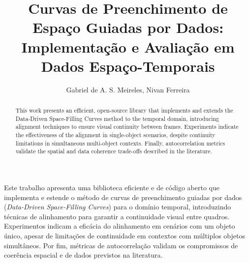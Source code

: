\documentclass[12pt]{article}
\title{Curvas de Preenchimento de Espaço Guiadas por Dados: \\ Implementação e Avaliação
em Dados Espaço-Temporais}
\author{Gabriel de A. S. Meireles, Nivan Ferreira}
\begin{document}
 

\maketitle

\begin{abstract}
  This work presents an efficient, open-source library that implements and extends the Data-Driven
  Space-Filling Curves method to the temporal domain, introducing alignment techniques to ensure visual continuity between
  frames. Experiments indicate the effectiveness of the alignment in single-object scenarios, despite continuity limitations
  in simultaneous multi-object contexts. Finally, autocorrelation metrics validate the spatial and data coherence trade-offs
  described in the literature.
\end{abstract}
     
\begin{resumo} 
  Este trabalho apresenta uma biblioteca eficiente e de código aberto
  que implementa e estende o método de curvas de preenchimento guiadas por dados (\textit{Data-Driven Space-Filling Curves})
  para o domínio temporal, introduzindo técnicas de alinhamento para garantir a continuidade visual entre quadros. Experimentos
  indicam a eficácia do alinhamento em cenários com um objeto único, apesar de limitações de continuidade em contextos
  com múltiplos objetos simultâneos. Por fim, métricas de autocorrelação validam os compromissos de coerência espacial e
  de dados previstos na literatura.

  

\end{resumo}
\end{document}
